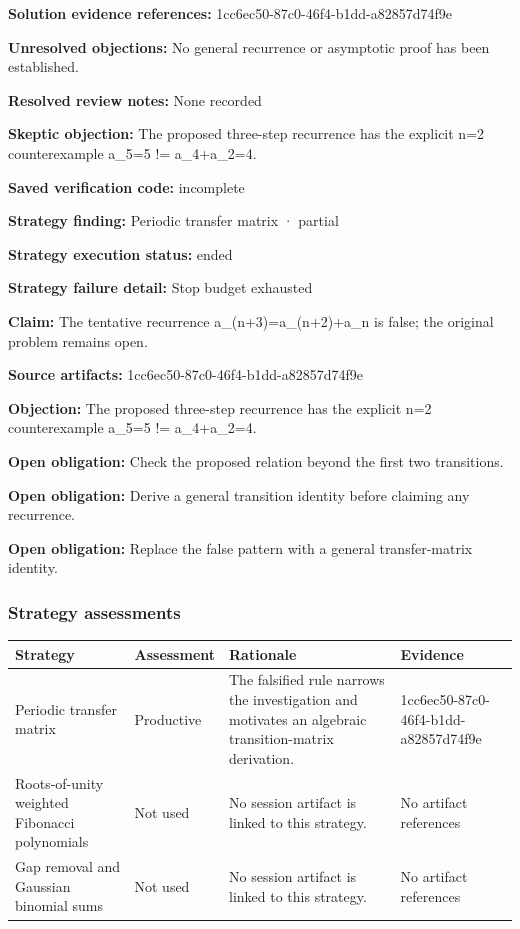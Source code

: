 \documentclass[11pt]{article}
\begin{document}
\textbf{Solution evidence references:} 1cc6ec50-87c0-46f4-b1dd-a82857d74f9e\par
\textbf{Unresolved objections:} No general recurrence or asymptotic proof has been established.\par
\textbf{Resolved review notes:} None recorded\par
\textbf{Skeptic objection:} The proposed three-step recurrence has the explicit n=2 counterexample a\_5=5 != a\_4+a\_2=4.\par
\textbf{Saved verification code:} incomplete\par
\textbf{Strategy finding:} Periodic transfer matrix · partial\par
\textbf{Strategy execution status:} ended\par
\textbf{Strategy failure detail:} Stop budget exhausted\par
\textbf{Claim:} The tentative recurrence a\_(n+3)=a\_(n+2)+a\_n is false; the original problem remains open.\par
\textbf{Source artifacts:} 1cc6ec50-87c0-46f4-b1dd-a82857d74f9e\par
\textbf{Objection:} The proposed three-step recurrence has the explicit n=2 counterexample a\_5=5 != a\_4+a\_2=4.\par
\textbf{Open obligation:} Check the proposed relation beyond the first two transitions.\par
\textbf{Open obligation:} Derive a general transition identity before claiming any recurrence.\par
\textbf{Open obligation:} Replace the false pattern with a general transfer-matrix identity.\par
\subsubsection*{Strategy assessments}
\begin{longtable}{>{\raggedright\arraybackslash}p{.16\linewidth}>{\raggedright\arraybackslash}p{.15\linewidth}>{\raggedright\arraybackslash}p{.40\linewidth}>{\raggedright\arraybackslash}p{.17\linewidth}}
\toprule Strategy & Assessment & Rationale & Evidence \\
\midrule\endhead
Periodic transfer matrix & Productive & The falsified rule narrows the investigation and motivates an algebraic transition-matrix derivation. & 1cc6ec50-87c0-46f4-b1dd-a82857d74f9e \\
Roots-of-unity weighted Fibonacci polynomials & Not used & No session artifact is linked to this strategy. & No artifact references \\
Gap removal and Gaussian binomial sums & Not used & No session artifact is linked to this strategy. & No artifact references \\
\bottomrule
\end{longtable}
\end{document}
